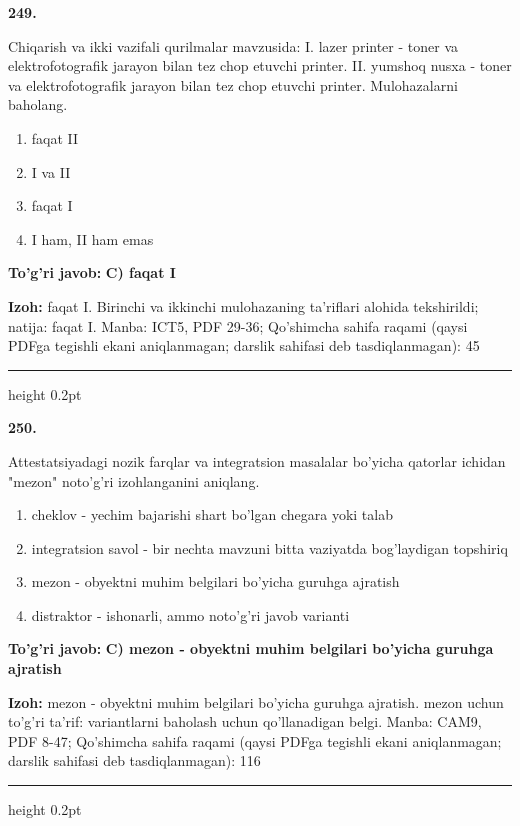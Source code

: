 \documentclass[10pt,a4paper]{article}
\begin{document}
{\bfseries\sffamily\color{ink} 249.}
\par
Chiqarish va ikki vazifali qurilmalar mavzusida: I. lazer printer - toner va elektrofotografik jarayon bilan tez chop etuvchi printer. II. yumshoq nusxa - toner va elektrofotografik jarayon bilan tez chop etuvchi printer. Mulohazalarni baholang.
\begin{enumerate}[label=\Alph*),leftmargin=9mm]
\item faqat II
\item I va II
\item faqat I
\item I ham, II ham emas
\end{enumerate}
\begin{tcolorbox}[enhanced,breakable,colback=teal!4,colframe=teal!60!black,boxrule=0.45pt,arc=1.2mm,left=2.7mm,right=2.7mm,top=1.8mm,bottom=1.8mm,before skip=2mm,after skip=2mm]
{\bfseries\sffamily\color{teal}To'g'ri javob:} \textbf{C) faqat I}
\par\smallskip
{\bfseries Izoh:} faqat I. Birinchi va ikkinchi mulohazaning ta'riflari alohida tekshirildi; natija: faqat I. Manba: ICT5, PDF 29-36; Qo'shimcha sahifa raqami (qaysi PDFga tegishli ekani aniqlanmagan; darslik sahifasi deb tasdiqlanmagan): 45
\end{tcolorbox}
\vspace{2mm}\hrule height 0.2pt\vspace{3mm}

{\bfseries\sffamily\color{ink} 250.}
\par
Attestatsiyadagi nozik farqlar va integratsion masalalar bo'yicha qatorlar ichidan "mezon" noto'g'ri izohlanganini aniqlang.
\begin{enumerate}[label=\Alph*),leftmargin=9mm]
\item cheklov - yechim bajarishi shart bo'lgan chegara yoki talab
\item integratsion savol - bir nechta mavzuni bitta vaziyatda bog'laydigan topshiriq
\item mezon - obyektni muhim belgilari bo'yicha guruhga ajratish
\item distraktor - ishonarli, ammo noto'g'ri javob varianti
\end{enumerate}
\begin{tcolorbox}[enhanced,breakable,colback=teal!4,colframe=teal!60!black,boxrule=0.45pt,arc=1.2mm,left=2.7mm,right=2.7mm,top=1.8mm,bottom=1.8mm,before skip=2mm,after skip=2mm]
{\bfseries\sffamily\color{teal}To'g'ri javob:} \textbf{C) mezon - obyektni muhim belgilari bo'yicha guruhga ajratish}
\par\smallskip
{\bfseries Izoh:} mezon - obyektni muhim belgilari bo'yicha guruhga ajratish. mezon uchun to'g'ri ta'rif: variantlarni baholash uchun qo'llanadigan belgi. Manba: CAM9, PDF 8-47; Qo'shimcha sahifa raqami (qaysi PDFga tegishli ekani aniqlanmagan; darslik sahifasi deb tasdiqlanmagan): 116
\end{tcolorbox}
\vspace{2mm}\hrule height 0.2pt\vspace{3mm}
\end{document}
